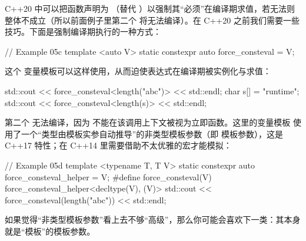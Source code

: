 C++20 中可以把函数声明为 （替代 ）以强制其“必须”在编译期求值，若无法则整体不成立（所以前面例子里第二个  将无法编译）。在 C++20 之前我们需要一些技巧。下面是强制编译期执行的一种方式：

\begin{code}
// Example 05c
template <auto V>
static constexpr auto force_consteval = V;
\end{code}

这个  变量模板可以这样使用，从而迫使表达式在编译期被实例化与求值：

\begin{code}
std::cout << force_consteval<length("abc")> << std::endl;
char s[] = "runtime";
std::cout << force_consteval<length(s)> << std::endl;
\end{code}

第二个  无法编译，因为  不能在该调用上下文被视为立即函数。这里的变量模板  使用了一个“类型由模板实参自动推导”的非类型模板参数（即  模板参数），这是 C++17 特性；在 C++14 里需要借助不太优雅的宏才能模拟：

\begin{code}
// Example 05d
template <typename T, T V>
static constexpr auto force_consteval_helper = V;
#define force_consteval(V)
force_consteval_helper<decltype(V), (V)>
std::cout << force_consteval(length("abc")) << std::endl;
\end{code}

如果觉得“非类型模板参数”看上去不够“高级”，那么你可能会喜欢下一类：其本身就是“模板”的模板参数。

